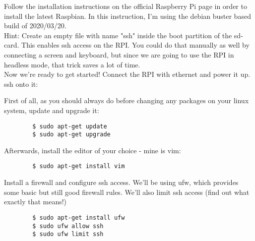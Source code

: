 \documentclass[]{article}
\begin{document}
    Follow the installation instructions on the official Raspberry Pi page in order to install the latest Raspbian.
    In this instruction, I'm using the debian buster based build of 2020/03/20.\\
    Hint: Create an empty file with name "ssh" inside the boot partition of the sd-card.
    This enables ssh access on the RPI.
    You could do that manually as well by connecting a screen and keyboard,
    but since we are going to use the RPI in headless mode,
    that trick saves a lot of time.\\
    Now we're ready to get started!
    Connect the RPI with ethernet and power it up.
    ssh onto it:

    First of all, as you should always do before changing any packages on your linux system, update and upgrade it:
    \begin{lstlisting}
        $ sudo apt-get update
        $ sudo apt-get upgrade
    \end{lstlisting}

    Afterwards, install the editor of your choice - mine is vim:
    \begin{lstlisting}
        $ sudo apt-get install vim
    \end{lstlisting}

    Install a firewall and configure ssh access.
    We'll be using ufw, which provides some basic but still good firewall rules.
    We'll also limit ssh access (find out what exactly that means!)
    \begin{lstlisting}
        $ sudo apt-get install ufw
        $ sudo ufw allow ssh
        $ sudo ufw limit ssh
    \end{lstlisting}
\end{document}

